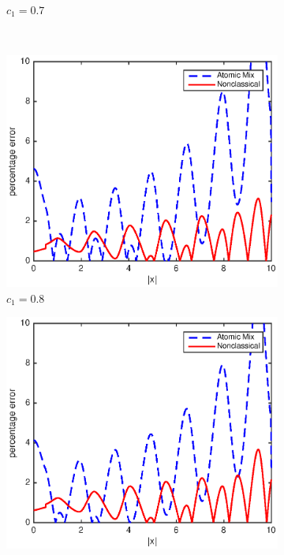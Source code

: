 \documentclass[12pt]{article}
\begin{document}
{\begin{figure}[p]
\begin{subfigure}{0.495\textwidth}
        \caption{$c_1 = 0.7$}
        \label{figerrA70}
    \end{subfigure}
    \\
    \centering
    \begin{subfigure}{0.495\textwidth}
        \centering
        \includegraphics[width=\textwidth]{NSE_err_A80.eps}
        \caption{$c_1 = 0.8$}
        \label{figerrA80}
    \end{subfigure}
    \hfill
    \begin{subfigure}{0.495\textwidth}
        \centering
        \includegraphics[width=\textwidth]{NSE_err_A90.eps}

\end{subfigure}
\end{figure}}
\end{document}
